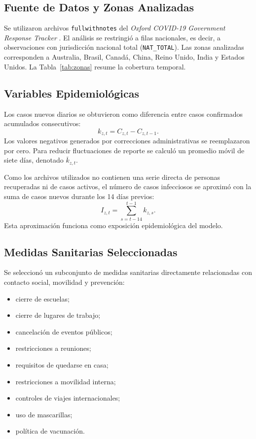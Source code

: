 \documentclass[12pt]{article}
\begin{document}
\subsection{Fuente de Datos y Zonas Analizadas}

Se utilizaron archivos \texttt{fullwithnotes} del \textit{Oxford COVID-19
Government Response Tracker} \cite{Hale2021}. El análisis se restringió a
filas nacionales, es decir, a observaciones con jurisdicción nacional total
(\texttt{NAT\_TOTAL}). Las zonas analizadas corresponden a Australia, Brasil,
Canadá, China, Reino Unido, India y Estados Unidos. La Tabla~\ref{tab:zonas}
resume la cobertura temporal.

\begin{table}[htbp]
  \centering
  \caption{Zonas geográficas incluidas en el análisis.}
  \label{tab:zonas}
  \resizebox{\textwidth}{!}{}
\end{table}

\subsection{Variables Epidemiológicas}

Los casos nuevos diarios se obtuvieron como diferencia entre casos confirmados
acumulados consecutivos:
\[
  k_{z,t} = C_{z,t} - C_{z,t-1}.
\]
Los valores negativos generados por correcciones administrativas se reemplazaron
por cero. Para reducir fluctuaciones de reporte se calculó un promedio móvil de
siete días, denotado \(\overline{k}_{z,t}\).

Como los archivos utilizados no contienen una serie directa de personas
recuperadas ni de casos activos, el número de casos infecciosos se aproximó con
la suma de casos nuevos durante los 14 días previos:
\[
  I_{z,t} = \sum_{s=t-14}^{t-1} k_{z,s}.
\]
Esta aproximación funciona como exposición epidemiológica del modelo.

\subsection{Medidas Sanitarias Seleccionadas}

Se seleccionó un subconjunto de medidas sanitarias directamente relacionadas
con contacto social, movilidad y prevención:

\begin{itemize}
  \item cierre de escuelas;
  \item cierre de lugares de trabajo;
  \item cancelación de eventos públicos;
  \item restricciones a reuniones;
  \item requisitos de quedarse en casa;
  \item restricciones a movilidad interna;
  \item controles de viajes internacionales;
  \item uso de mascarillas;
  \item política de vacunación.
\end{itemize}
\end{document}
